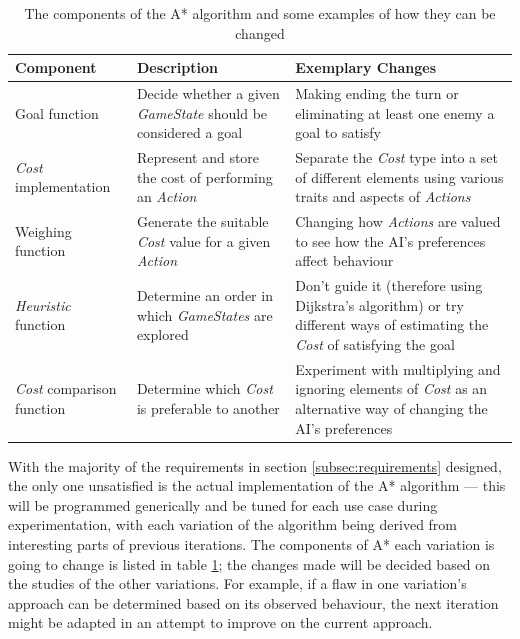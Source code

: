 \documentclass[11pt, a4paper]{report}
\begin{document}
\begin{table}[!h]
  \centering
  \begin{tabular}{ | m{2.5cm} | m{4cm} | m{6cm} |}
    \hline
    \textbf{Component} & \textbf{Description} & \textbf{Exemplary Changes} \\ \hline
    Goal function & Decide whether a given \emph{GameState} should be considered a goal & Making ending the turn or eliminating at least one enemy a goal to satisfy \\ \hline
    \emph{Cost} implementation & Represent and store the cost of performing an \emph{Action} & Separate the \emph{Cost} type into a set of different elements using various traits and aspects of \emph{Actions} \\ \hline
    Weighing function & Generate the suitable \emph{Cost} value for a given \emph{Action} & Changing how \emph{Actions} are valued to see how the AI's preferences affect behaviour \\ \hline
    \emph{Heuristic} function & Determine an order in which \emph{GameStates} are explored & Don't guide it (therefore using Dijkstra's algorithm) or try different ways of estimating the \emph{Cost} of satisfying the goal \\ \hline
    \emph{Cost} comparison function & Determine which \emph{Cost} is preferable to another & Experiment with multiplying and ignoring elements of \emph{Cost} as an alternative way of changing the AI's preferences \\
    \hline
  \end{tabular}
  \caption{The components of the A* algorithm and some examples of how they can be changed}
  \label{table:designingAStarVariations}
\end{table}

With the majority of the requirements in section \ref{subsec:requirements} designed, the only one unsatisfied is the actual implementation of the A* algorithm --- this will be programmed generically and be tuned for each use case during experimentation, with each variation of the algorithm being derived from interesting parts of previous iterations. The components of A* each variation is going to change is listed in table \ref{table:designingAStarVariations}; the changes made will be decided based on the studies of the other variations. For example, if a flaw in one variation's approach can be determined based on its observed behaviour, the next iteration might be adapted in an attempt to improve on the current approach.
\end{document}
